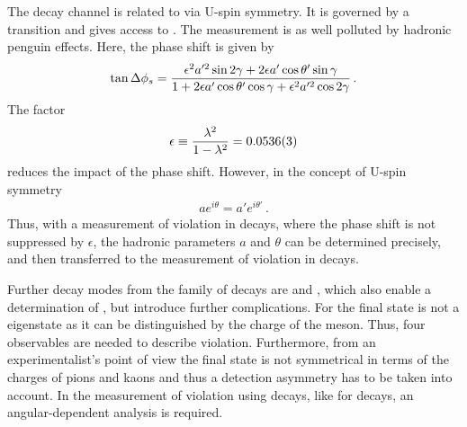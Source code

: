 The decay channel \BsToDsDs is related to \BdToDD via U-spin symmetry. It is
governed by a \bToccbars transition and gives access to \phis. The
measurement is as well polluted by hadronic penguin effects. Here, the phase
shift is given by
\begin{align}
	\tan\Delta{\ensuremath{\phi_{{s}}}} = \frac{\epsilon^2a'^2\sin2\gamma + 2\epsilon a'\cos\theta'\sin\gamma}{1 + 2\epsilon a'\cos\theta'\cos\gamma + \epsilon^2a'^2\cos2\gamma}\,.
\end{align}
The factor
\begin{align}
	\epsilon \equiv \frac{\lambda^2}{1 - \lambda^2} = \num{0.0536\pm0.0003}
\end{align}
reduces the impact of the phase shift. However, in the concept of U-spin symmetry
\begin{align}
	ae^{i\theta} = a'e^{i\theta'}\,.
\end{align}
Thus, with a measurement of \CP violation in \BdToDD decays, where the phase
shift is not suppressed by $\epsilon$, the hadronic parameters $a$ and
$\theta$ can be determined precisely, and then transferred to the measurement
of \CP violation in \BsToDsDs decays.

Further decay modes from the family of \BToDDbar decays are \BdToDstD and
\BdToDstDst, which also enable a determination of \phideff, but introduce
further complications. For \BdToDstD the final state is not a \CP eigenstate
as it can be distinguished by the charge of the \Dstarpm meson. Thus, four \CP
observables are needed to describe \CP violation. Furthermore, from an
experimentalist's point of view the final state is not symmetrical in terms of
the charges of pions and kaons and thus a detection asymmetry has to be taken
into account. In the measurement of \CP violation using \BdToDstDst decays,
like for \BsToJPsiPhi decays, an angular-dependent analysis is required.
